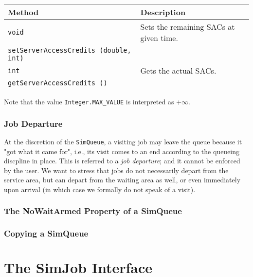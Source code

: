 \documentclass[12pt]{book}
\begin{document}
\begin{tabular}{|l|l|}
  \hline
  {\bf Method} & {\bf Description} \\
  \hline
  \lstinline[basicstyle=\footnotesize]!void!
    & Sets the remaining SACs at given time.
    \\
  \lstinline[basicstyle=\footnotesize]!setServerAccessCredits (double, int)!
    &
    \\ \hline
  \lstinline[basicstyle=\footnotesize]!int!
    & Gets the actual SACs.
    \\
  \lstinline[basicstyle=\footnotesize]!getServerAccessCredits ()!
    &
    \\ \hline
\end{tabular}

Note that the value \lstinline-Integer.MAX_VALUE- is interpreted as $+\infty$.

\subsubsection{Job Departure}

At the discretion of the \lstinline|SimQueue|,
  a visiting job may leave the queue
  because it "got what it came for",
  i.e.,
  its visit comes to an end
  according to the queueing discpline in place.
This is referred to a {\em job departure\/};
  and it cannot be enforced by the user.
We want to stress that jobs do not necessarily
  depart from the service area,
  but can depart from the waiting area as well,
  or even immediately upon arrival
  (in which case we formally do not speak of a visit).

\subsubsection{The NoWaitArmed Property of a SimQueue}

\subsubsection{Copying a SimQueue}

\section{The SimJob Interface}
\end{document}
